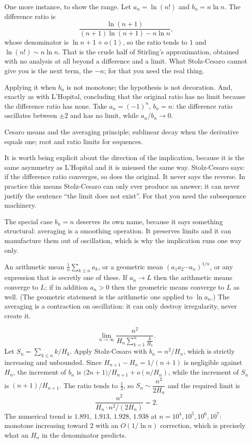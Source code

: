 One more instance, to show the range. Let $a_n=\ln(n!)$ and $b_n=n\ln n$. The difference ratio is
\[\frac{\ln(n+1)}{(n+1)\ln(n+1)-n\ln n},\]
whose denominator is $\ln n+1+o(1)$, so the ratio tends to $1$ and $\ln(n!)\sim n\ln n$. That is the crude half of Stirling's approximation, obtained with no analysis at all beyond a difference and a limit. What Stolz-Cesaro cannot give you is the next term, the $-n$; for that you need the real thing.

\begin{trap}
Applying it when $b_n$ is not monotone; the hypothesis is not decoration. And, exactly as with L'Hopital, concluding that the original ratio has no limit because the difference ratio has none. Take $a_n=(-1)^n$, $b_n=n$: the difference ratio oscillates between $\pm2$ and has no limit, while $a_n/b_n\to0$.
\end{trap}

\begin{seealsob}Cesaro means and the averaging principle; sublinear decay when the derivative equals one; root and ratio limits for sequences.\end{seealsob}

It is worth being explicit about the direction of the implication, because it is the same asymmetry as L'Hopital and it is misused the same way. Stolz-Cesaro says: if the difference ratio converges, so does the original. It never says the reverse. In practice this means Stolz-Cesaro can only ever produce an answer; it can never justify the sentence ``the limit does not exist''. For that you need the subsequence machinery.

The special case $b_n=n$ deserves its own name, because it says something structural: averaging is a smoothing operation. It preserves limits and it can manufacture them out of oscillation, which is why the implication runs one way only.

\cue An arithmetic mean $\tfrac1n\sum_{k\le n}a_k$, or a geometric mean $(a_1a_2\cdots a_n)^{1/n}$, or any expression that is secretly one of these.
\method If $a_n\to L$ then the arithmetic means converge to $L$; if in addition $a_n>0$ then the geometric means converge to $L$ as well. (The geometric statement is the arithmetic one applied to $\ln a_n$.) The averaging is a contraction on oscillation: it can only destroy irregularity, never create it.

\begin{worked}
\[\lim_{n\to\infty}\frac{n^2}{H_n\displaystyle\sum_{k=1}^{n}\frac{k}{H_k}}.\]
Let $S_n=\sum_{k\le n}k/H_k$. Apply Stolz-Cesaro with $b_n=n^2/H_n$, which is strictly increasing and unbounded. Since $H_{n+1}-H_n=1/(n+1)$ is negligible against $H_n$, the increment of $b_n$ is $\bigl(2n+1\bigr)/H_{n+1}+o(n/H_n)$, while the increment of $S_n$ is $(n+1)/H_{n+1}$. The ratio tends to $\tfrac12$, so $S_n\sim\dfrac{n^2}{2H_n}$ and the required limit is
\[\frac{n^2}{H_n\cdot n^2/(2H_n)}=2.\]
The numerical trend is $1.891$, $1.913$, $1.928$, $1.938$ at $n=10^4,10^5,10^6,10^7$: monotone increasing toward $2$ with an $O(1/\ln n)$ correction, which is precisely what an $H_n$ in the denominator predicts.
\end{worked}


